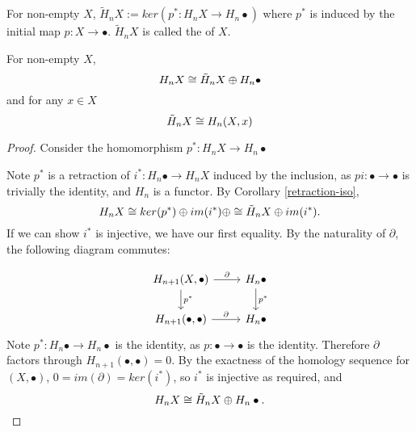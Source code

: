 \begin{definition}
For non-empty $X$, $\tilde{H}_nX:=ker(p^*:H_nX\rightarrow H_n\bullet)$ where $p^*$ is induced by the initial map $p:X\rightarrow \bullet$. $\tilde{H}_nX$ is called the  of $X$.
\end{definition}

\begin{prop}
\label{reduced-homology}
For non-empty $X$,
$$H_nX\cong\tilde{H}_nX\oplus H_n\bullet$$
and for any $x\in X$ $$\tilde{H}_nX\cong H_n(X,x)$$
\end{prop}
\begin{proof}
Consider the homomorphism $p^*:H_nX\rightarrow H_n\bullet$


Note $p^*$ is a retraction of $i^*:H_n\bullet \rightarrow H_n X$ induced by the inclusion, as $pi:\bullet\rightarrow \bullet$ is trivially the identity, and $H_n$ is a functor. By Corollary \ref{retraction-iso}, $$H_nX\cong ker(p^*)\oplus im(i^*)\oplus \cong \tilde{H}_nX\oplus im(i^*).$$ If we can show $i^*$ is injective, we have our first equality. By the naturality of $\partial$, the following diagram commutes:

\[\begin{tikzcd}
{H_{n+1}(X,\bullet)} \arrow[r, "\partial"] \arrow[d, "p^*"] & H_n\bullet \arrow[d, "p^*"] \\
{H_{n+1}(\bullet,\bullet)} \arrow[r, "\partial"]              & H_n\bullet                 
\end{tikzcd}\]
Note $p^*:H_n\bullet\rightarrow H_n\bullet$ is the identity, as $p:\bullet\rightarrow\bullet$ is the identity. Therefore $\partial$ factors through $H_{n+1}(\bullet,\bullet)=0$. By the exactness of the homology sequence for $(X,\bullet)$, $0=im(\partial)=ker(i^*)$, so $i^*$ is injective as required, and $$H_nX\cong \tilde{H}_nX\oplus H_n\bullet.$$



\end{proof}
